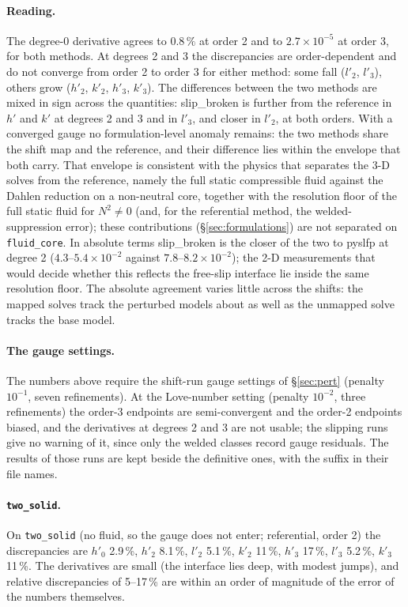 \documentclass[11pt]{article}
\numberwithin{equation}{section}
\newcommand{\code}[1]{\texttt{#1}}
\begin{document}
\paragraph{Reading.}
The degree-0 derivative agrees to $0.8\,\%$ at order 2 and to
$2.7\times10^{-5}$ at order 3, for both methods. At degrees 2 and 3 the
discrepancies are order-dependent and do not converge from order 2 to
order 3 for either method: some fall ($l'_2$, $l'_3$), others grow ($h'_2$,
$k'_2$, $h'_3$, $k'_3$). The differences between the two methods are
mixed in sign across the quantities: slip\_broken is further from the
reference in $h'$ and $k'$ at degrees 2 and 3 and in $l'_3$, and closer in
$l'_2$, at both orders. With a
converged gauge no formulation-level anomaly remains: the two methods share
the shift map and the reference, and their difference lies within the
envelope that both carry. That envelope is consistent with the physics
that separates the 3-D solves from the reference, namely the full static
compressible fluid against the Dahlen reduction on a non-neutral core,
together with the resolution floor of the full static fluid for $N^2\ne0$
(and, for the referential method, the welded-suppression error); these
contributions (\S\ref{sec:formulations}) are not separated on
\code{fluid\_core}. In absolute terms slip\_broken is the closer of the
two to pyslfp at degree 2 ($4.3$--$5.4\times10^{-2}$ against
$7.8$--$8.2\times10^{-2}$); the 2-D measurements that would decide
whether this reflects the free-slip interface lie inside the same
resolution floor. The absolute agreement varies little across the shifts:
the mapped solves track the perturbed models about as well as the
unmapped solve tracks the base model.

\paragraph{The gauge settings.}
The numbers above require the shift-run gauge settings of
\S\ref{sec:pert} (penalty $10^{-1}$, seven refinements). At the
Love-number setting (penalty $10^{-2}$, three refinements) the order-3
endpoints are semi-convergent and the order-2 endpoints biased, and the
derivatives at degrees 2 and 3 are not usable; the slipping runs give no
warning of it, since only the welded classes record gauge residuals. The
results of those runs are kept beside the definitive ones, with the suffix
 in their file names.

\paragraph{\code{two\_solid}.}
On \code{two\_solid} (no fluid, so the gauge does not enter; referential,
order 2) the discrepancies are $h'_0$ 2.9\,\%, $h'_2$ 8.1\,\%, $l'_2$
5.1\,\%, $k'_2$ 11\,\%, $h'_3$ 17\,\%, $l'_3$ 5.2\,\%, $k'_3$ 11\,\%. The
derivatives are small (the interface lies deep, with modest jumps), and
relative discrepancies of 5--17\,\% are within an order of magnitude of
the error of the numbers themselves.
\end{document}
